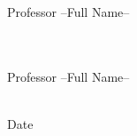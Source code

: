 \begin{multicols}{2}
\begin{flushright}
\vspace{1cm}

\quad  \\[-.35cm]
\underline{\phantom{\hspace{7cm}}} \\
Professor --Full Name--

\vspace{1cm}

\quad  \\[-.35cm]
\underline{\phantom{\hspace{7cm}}} \\
Professor --Full Name--

\end{flushright}
\end{multicols}

\vspace{2cm}


\begin{center}
\large
\underline{\phantom{\hspace{4cm}}} \\
Date
\end{center}

%
